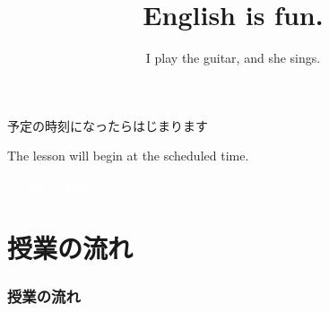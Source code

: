 \documentclass[aspectratio=169,xcolor={dvipsnames,table}]{beamer}
\title{English is fun.}
\subtitle{I play the guitar, and she sings.}
\author{}
\institute[]{}
\date[]
\begin{document}
\begin{frame}[label=waiting]{}
\thispagestyle{empty}
\Large
\raggedright

予定の時刻になったらはじまります

\vfill

\raggedleft

The lesson will begin at the scheduled time.
\end{frame}
%
%
%
\begin{frame}
\centering
  \textcolor{white}{\Huge\bfseries Today's Quiz}
\end{frame}
\begin{frame}[label=title]
\thispagestyle{empty}
\titlepage
\end{frame}
\section*{授業の流れ}
\begin{frame}[plain]
  \frametitle{授業の流れ}
  \tableofcontents
\end{frame}
\end{document}
